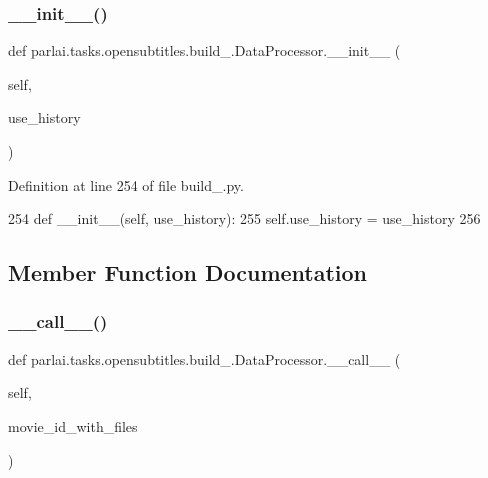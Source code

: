 \subsubsection{\texorpdfstring{\+\_\+\+\_\+init\+\_\+\+\_\+()}{\_\_init\_\_()}}
{\footnotesize\ttfamily def parlai.\+tasks.\+opensubtitles.\+build\+\_.\+Data\+Processor.\+\_\+\+\_\+init\+\_\+\+\_\+ (\begin{DoxyParamCaption}\item[{}]{self,  }\item[{}]{use\+\_\+history }\end{DoxyParamCaption})}



Definition at line 254 of file build\+\_.\+py.


\begin{DoxyCode}
254     \textcolor{keyword}{def }\_\_init\_\_(self, use\_history):
255         self.use\_history = use\_history
256 
\end{DoxyCode}


\subsection{Member Function Documentation}
\mbox{\label{classparlai_1_1tasks_1_1opensubtitles_1_1build__2018_1_1DataProcessor_a64433b1be4945c3e7b781be536dede58}} 
\subsubsection{\texorpdfstring{\+\_\+\+\_\+call\+\_\+\+\_\+()}{\_\_call\_\_()}}
{\footnotesize\ttfamily def parlai.\+tasks.\+opensubtitles.\+build\+\_.\+Data\+Processor.\+\_\+\+\_\+call\+\_\+\+\_\+ (\begin{DoxyParamCaption}\item[{}]{self,  }\item[{}]{movie\+\_\+id\+\_\+with\+\_\+files }\end{DoxyParamCaption})}



